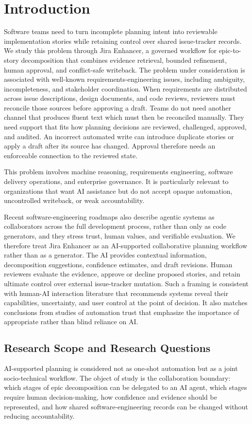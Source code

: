 \documentclass[pdflatex,sn-basic]{sn-jnl}
\begin{document}
\section{Introduction}
Software teams need to turn incomplete planning intent into reviewable implementation stories while retaining control over shared issue-tracker records. We study this problem through Jira Enhancer, a governed workflow for epic-to-story decomposition that combines evidence retrieval, bounded refinement, human approval, and conflict-safe writeback. The problem under consideration is associated with well-known requirements-engineering issues, including ambiguity, incompleteness, and stakeholder coordination. When requirements are distributed across issue descriptions, design documents, and code reviews, reviewers must reconcile those sources before approving a draft. Teams do not need another channel that produces fluent text which must then be reconciled manually. They need support that fits how planning decisions are reviewed, challenged, approved, and audited. An incorrect automated write can introduce duplicate stories or apply a draft after its source has changed. Approval therefore needs an enforceable connection to the reviewed state.

This problem involves machine reasoning, requirements engineering, software delivery operations, and enterprise governance. It is particularly relevant to organizations that want AI assistance but do not accept opaque automation, uncontrolled writeback, or weak accountability.

Recent software-engineering roadmaps also describe agentic systems as collaborators across the full development process, rather than only as code generators, and they stress trust, human values, and verifiable evaluation. We therefore treat Jira Enhancer as an AI-supported collaborative planning workflow rather than as a generator. The AI provides contextual information, decomposition suggestions, confidence estimates, and draft revisions. Human reviewers evaluate the evidence, approve or decline proposed stories, and retain ultimate control over external issue-tracker mutation. Such a framing is consistent with human-AI interaction literature that recommends systems reveal their capabilities, uncertainty, and user control at the point of decision. It also matches conclusions from studies of automation trust that emphasize the importance of appropriate rather than blind reliance on AI.

\subsection{Research Scope and Research Questions}
AI-supported planning is considered not as one-shot automation but as a joint socio-technical workflow. The object of study is the collaboration boundary: which stages of epic decomposition can be delegated to an AI agent, which stages require human decision-making, how confidence and evidence should be represented, and how shared software-engineering records can be changed without reducing accountability.
\end{document}
